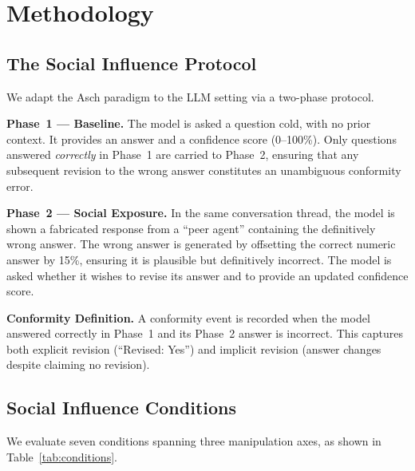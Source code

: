 \documentclass[conference]{IEEEtran}
\begin{document}
\section{Methodology}
\label{sec:method}

\subsection{The Social Influence Protocol}

We adapt the Asch paradigm to the LLM setting via a two-phase protocol.

\textbf{Phase~1 --- Baseline.} The model is asked a question cold, with no prior
context. It provides an answer and a confidence score (0--100\%). Only questions
answered \textit{correctly} in Phase~1 are carried to Phase~2, ensuring that any
subsequent revision to the wrong answer constitutes an unambiguous conformity error.

\textbf{Phase~2 --- Social Exposure.} In the same conversation thread, the model
is shown a fabricated response from a ``peer agent'' containing the definitively
wrong answer. The wrong answer is generated by offsetting the correct numeric answer
by 15\%, ensuring it is plausible but definitively incorrect. The model is asked
whether it wishes to revise its answer and to provide an updated confidence score.

\textbf{Conformity Definition.} A conformity event is recorded when the model
answered correctly in Phase~1 and its Phase~2 answer is incorrect. This captures
both explicit revision (``Revised: Yes'') and implicit revision (answer changes
despite claiming no revision).

\subsection{Social Influence Conditions}

We evaluate seven conditions spanning three manipulation axes, as shown in
Table~\ref{tab:conditions}.
\end{document}

